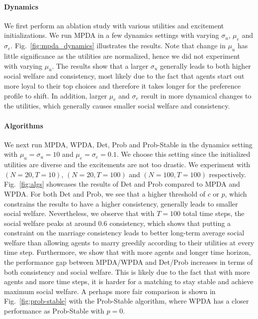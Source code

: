 \paragraph{Dynamics} We first perform an ablation study with various utilities and excitement initializations. We run MPDA in a few dynamics settings with varying $\sigma_u$, $\mu_e$ and $\sigma_e$. Fig.~\ref{fig:mpda_dynamics} illustrates the results. Note that change in $\mu_u$ has little significance as the utilities are normalized, hence we did not experiment with varying $\mu_u$. The results show that a larger $\sigma_u$ generally leads to both higher social welfare and consistency, most likely due to the fact that agents start out more loyal to their top choices and therefore it takes longer for the preference profile to shift. In addition, larger $\mu_e$ and $\sigma_e$ result in more dynamical changes to the utilities, which generally causes smaller social welfare and consistency.



\paragraph{Algorithms} We next run MPDA, WPDA, Det, Prob and Prob-Stable in the dynamics setting with $\mu_u = \sigma_u = 10$ and $\mu_e = \sigma_e = 0.1$. We choose this setting since the initialized utilities are diverse and the excitements are not too drastic. We experiment with $(N=20, T=10)$, $(N=20, T=100)$ and $(N=100, T=100)$ respectively. Fig.~\ref{fig:algs} showcases the results of Det and Prob compared to MPDA and WPDA. For both Det and Prob, we see that a higher threshold of $c$ or $p$, which constrains the results to have a higher consistency, generally leads to smaller social welfare. Nevertheless, we observe that with $T=100$ total time steps, the social welfare peaks at around 0.6 consistency, which shows that putting a constraint on the marriage consistency leads to better long-term average social welfare than allowing agents to marry greedily according to their utilities at every time step. Furthermore, we show that with more agents and longer time horizon, the performance gap between MPDA/WPDA and Det/Prob increases in terms of both consistency and social welfare. This is likely due to the fact that with more agents and more time steps, it is harder for a matching to stay stable and achieve maximum social welfare. A perhaps more fair comparison is shown in Fig.~\ref{fig:prob-stable} with the Prob-Stable algorithm, where WPDA has a closer performance as Prob-Stable with $p=0$.

